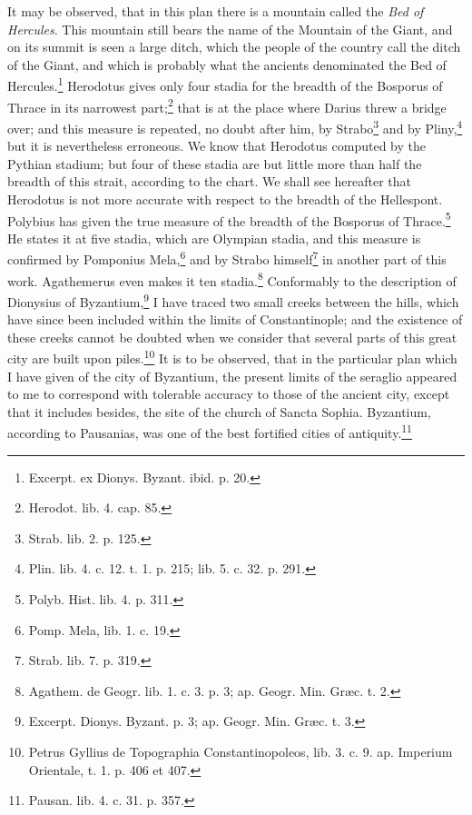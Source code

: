 \documentclass[a4paper, 11pt, oneside, polutonikogreek, english]{article}
\begin{document}
It may be observed, that in this plan there is a mountain called the \emph{Bed of Hercules}. This mountain still bears the name of the Mountain of the Giant, and on its summit is seen a large ditch, which the people of the country call the ditch of the Giant, and which is probably what the ancients denominated the Bed of Hercules.\footnote{Excerpt. ex Dionys. Byzant. ibid. p. 20.} Herodotus gives only four stadia for the breadth of the Bosporus of Thrace in its narrowest part;\footnote{Herodot. lib. 4. cap. 85.} that is at the place where Darius threw a bridge over; and this measure is repeated, no doubt after him, by Strabo\footnote{Strab. lib. 2. p. 125.} and by Pliny,\footnote{Plin. lib. 4. c. 12. t. 1. p. 215; lib. 5. c. 32. p. 291.} but it is nevertheless erroneous. We know that Herodotus computed by the Pythian stadium; but four of these stadia are but little more than half the breadth of this strait, according to the chart. We shall see hereafter that Herodotus is not more accurate with respect to the breadth of the Hellespont. Polybius has given the true measure of the breadth of the Bosporus of Thrace.\footnote{Polyb. Hist. lib. 4. p. 311.} He states it at five stadia, which are Olympian stadia, and this measure is confirmed by Pomponius Mela,\footnote{Pomp. Mela, lib. 1. c. 19.} and by Strabo himself\footnote{Strab. lib. 7. p. 319.} in another part of this work. Agathemerus even makes it ten stadia.\footnote{Agathem. de Geogr. lib. 1. c. 3. p. 3; ap. Geogr. Min. Græc. t. 2.} Conformably to the description of Dionysius of Byzantium,\footnote{Excerpt. Dionys. Byzant. p. 3; ap. Geogr. Min. Græc. t. 3.} I have traced two small creeks between the hills, which have since been included within the limits of Constantinople; and the existence of these creeks cannot be doubted when we consider that several parts of this great city are built upon piles.\footnote{Petrus Gyllius de Topographia Constantinopoleos, lib. 3. c. 9. ap. Imperium Orientale, t. 1. p. 406 et 407.} It is to be observed, that in the particular plan which I have given of the city of Byzantium, the present limits of the seraglio appeared to me to correspond with tolerable accuracy to those of the ancient city, except that it includes besides, the site of the church of Sancta Sophia. Byzantium, according to Pausanias, was one of the best fortified cities of antiquity.\footnote{Pausan. lib. 4. c. 31. p. 357.}
\end{document}
